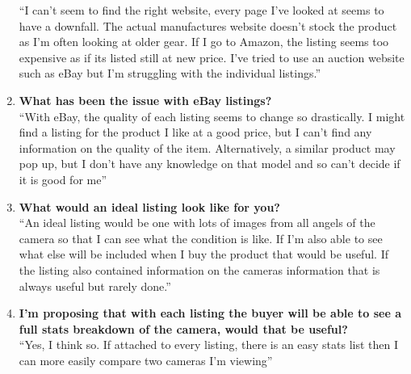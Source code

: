 \begin{enumerate}
“I can’t seem to find the right website, every page I’ve looked at seems to have a downfall. The actual manufactures website doesn’t stock the product as I’m often looking at older gear. If I go to Amazon, the listing seems too expensive as if its listed still at new price. I’ve tried to use an auction website such as eBay but I’m struggling with the individual listings.”
\item \textbf{What has been the issue with eBay listings?} \\
“With eBay, the quality of each listing seems to change so drastically. I might find a listing for the product I like at a good price, but I can’t find any information on the quality of the item. Alternatively, a similar product may pop up, but I don’t have any knowledge on that model and so can’t decide if it is good for me”
\item \textbf{What would an ideal listing look like for you?} \\
“An ideal listing would be one with lots of images from all angels of the camera so that I can see what the condition is like. If I’m also able to see what else will be included when I buy the product that would be useful. If the listing also contained information on the cameras information that is always useful but rarely done.”
\item \textbf{I’m proposing that with each listing the buyer will be able to see a full stats breakdown of the camera, would that be useful?} \\
“Yes, I think so. If attached to every listing, there is an easy stats list then I can more easily compare two cameras I’m viewing”
\end{enumerate}

